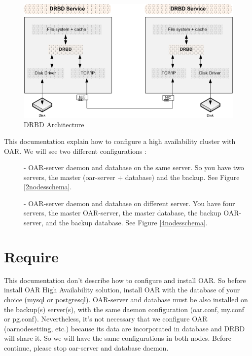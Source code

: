 \documentclass[a4paper,10pt]{report}
\begin{document}
\begin{figure}
\begin{center}
\includegraphics[scale=0.5]{schema/DRBD.png}
\end{center}
\caption{DRBD Architecture} 
\label{drbd} 
\end{figure} 



This documentation explain how to configure a high availability cluster with OAR. We will see two different configurations :
\begin{description}
\item[]- OAR-server daemon and database on the same server. So you have two servers, the master (oar-server + database) and the backup. See Figure \ref{2nodesschema}.


\item[]- OAR-server daemon and database on different server. You have four servers, the master OAR-server, the master database, the backup OAR-server, and the backup database.
See Figure \ref{4nodesschema}.

\end{description}


\section{Require}
This documentation don't describe how to configure and install OAR. So before install OAR High Availability solution, 
install OAR with the database of your choice (mysql or postgresql). OAR-server and database must be also installed on the backup(s) server(s), 
with the same daemon configuration (oar.conf, my.conf or pg.conf). 
Nevertheless, it's not necessary that we configure OAR (oarnodesetting, etc.) because its data are incorporated in database and DRBD will share it. So we will have the same configurations in both nodes.
Before continue, please stop oar-server and database daemon.
\end{document}
